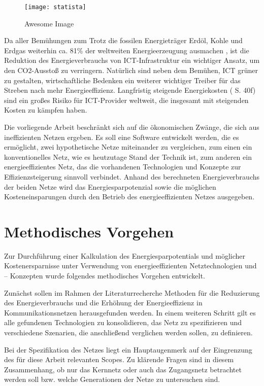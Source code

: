\documentclass[12pt,titlepage]{article}
\begin{document}
\begin{figure}[!ht]
    \centering
    \texttt{[image: statista]}
    \caption{Awesome Image}
    \label{fig:awesome_image}
\end{figure}

Da aller Bemühungen zum Trotz die fossilen Energieträger Erdöl, Kohle und Erdgas weiterhin ca. 81\% der weltweiten Energieerzeugung ausmachen \cite{statista}, ist die Reduktion des Energieverbrauchs von ICT-Infrastruktur ein wichtiger Ansatz, um den CO2-Ausstoß zu verringern. Natürlich sind neben dem Bemühen, ICT grüner zu gestalten, wirtschaftliche Bedenken ein weiterer wichtiger Treiber für das Streben nach mehr Energieeffizienz. Langfristig steigende Energiekosten (\cite{iea2015} S. 40f) sind ein großes Risiko für ICT-Provider weltweit, die insgesamt mit steigenden Kosten zu kämpfen haben.
 
Die vorliegende Arbeit beschränkt sich auf die ökonomischen Zwänge, die sich aus ineffizienten Netzen ergeben. Es soll eine Software entwickelt werden, die es ermöglicht, zwei hypothetische Netze miteinander zu vergleichen, zum einen ein konventionelles Netz, wie es heutzutage Stand der Technik ist, zum anderen ein energieeffizientes Netz, das die vorhandenen Technologien und Konzepte zur Effizienzsteigerung sinnvoll verbindet. Anhand des berechneten Energieverbrauchs der beiden Netze wird das Energiesparpotenzial sowie die möglichen Kosteneinsparungen durch den Betrieb des energieeffizienten Netzes ausgegeben.


\section{Methodisches Vorgehen}
Zur Durchführung einer Kalkulation des Energiesparpotentials und möglicher Kostenersparnisse unter Verwendung von energieeffizienten Netztechnologien und – Konzepten wurde folgendes methodisches Vorgehen entwickelt. 
 
Zunächst sollen im Rahmen der Literaturrecherche Methoden für die Reduzierung des Energieverbrauchs und die Erhöhung der Energieeffizienz in Kommunikationsnetzen herausgefunden werden. In einem weiteren Schritt gilt es alle gefundenen Technologien zu konsolidieren, das Netz zu spezifizieren und verschiedene Szenarien, die anschließend verglichen werden sollen, zu definieren. 
 
Bei der Spezifikation des Netzes liegt ein Hauptaugenmerk auf der Eingrenzung des für diese Arbeit relevanten Scopes. Zu klärende Fragen sind in diesem Zusammenhang, ob nur das Kernnetz oder auch das Zugangsnetz betrachtet werden soll bzw. welche Generationen der Netze zu untersuchen sind. 
 
\end{document}
